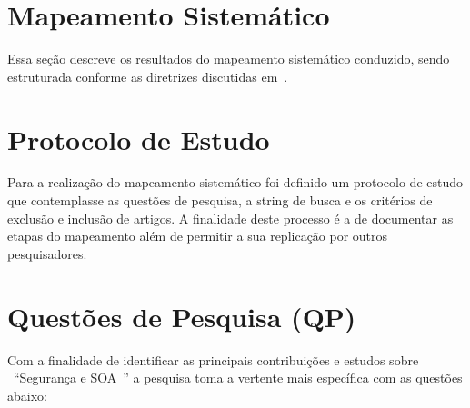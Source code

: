 \section{Mapeamento Sistemático}

Essa seção descreve os resultados do mapeamento sistemático conduzido, sendo estruturada conforme as diretrizes discutidas em~\cite{Petersen2008}.


\section{Protocolo de Estudo}

Para a realização do mapeamento sistemático foi definido um protocolo de estudo que contemplasse as questões de pesquisa, a string de busca e os critérios de exclusão e inclusão de artigos. A finalidade deste processo é a de documentar as etapas do mapeamento além de permitir a sua replicação por outros pesquisadores.

\section{Questões de Pesquisa (QP)}

Com a finalidade de identificar as principais contribuições e estudos sobre \ ``Segurança e SOA\ '' a pesquisa toma a vertente mais específica com as questões abaixo:


